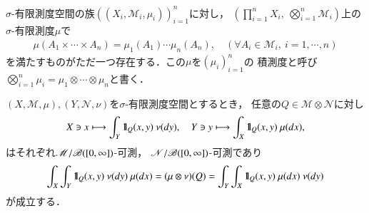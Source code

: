 	\begin{screen}
		\begin{dfn}[積測度]
			$\sigma$-有限測度空間の族$\left((X_i,\mathscr{M}_i,\mu_i)\right)_{i=1}^n$に対し，
			$\left( \prod_{i=1}^n X_i,\ \bigotimes_{i=1}^n \mathscr{M}_i \right)$上の
			$\sigma$-有限測度$\mu$で
			\begin{align}
				\mu(A_1 \times \cdots \times A_n)
				= \mu_1(A_1) \cdots \mu_n(A_n),
				\quad (\forall A_i \in \mathscr{M}_i,\ i=1,\cdots,n)
			\end{align}
			を満たすものがただ一つ存在する．この$\mu$を$(\mu_i)_{i=1}^n$の
			積測度と呼び$\bigotimes_{i=1}^n \mu_i = \mu_1 \otimes \cdots \otimes \mu_n$と書く．
		\end{dfn}
	\end{screen}
	
	\begin{screen}
		\begin{lem}
			$(X,\mathscr{M},\mu),(Y,\mathscr{N},\nu)$を$\sigma$-有限測度空間とするとき，
			任意の$Q \in \mathscr{M} \otimes \mathscr{N}$に対し
			\begin{align}
				X \ni x \longmapsto \int_Y \defunc_{Q}(x,y)\ \nu(dy),
				\quad Y \ni y \longmapsto \int_X \defunc_{Q}(x,y)\ \mu(dx),
			\end{align}
			はそれぞれ$\mathscr{M}/\mathscr{B}([0,\infty])$-可測，
			$\mathscr{N}/\mathscr{B}([0,\infty])$-可測であり
			\begin{align}
				\int_X \int_Y \mbox{1}\hspace{-0.25em}\mbox{l}_Q (x,y)\ \nu(dy)\ \mu(dx)
				= (\mu \otimes \nu)(Q)
				= \int_Y \int_X \mbox{1}\hspace{-0.25em}\mbox{l}_Q (x,y)\ \mu(dx)\ \nu(dy)
			\end{align}
			が成立する．
		\end{lem}
	\end{screen}
	
